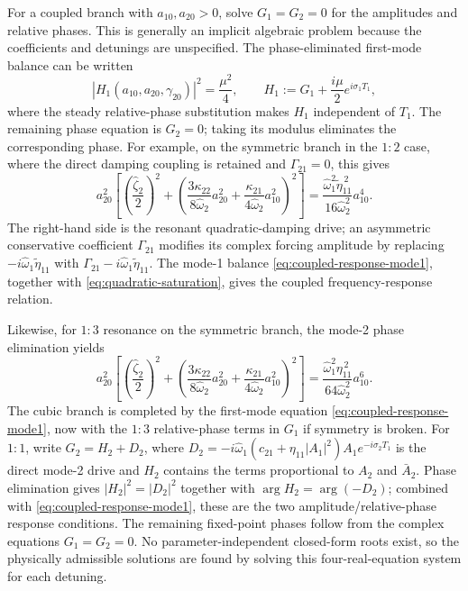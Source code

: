\documentclass[11pt]{article}
\begin{document}
For a coupled branch with $a_{10},a_{20}>0$, solve $G_1=G_2=0$ for the amplitudes and relative phases. This is generally an implicit algebraic problem because the coefficients and detunings are unspecified. The phase-eliminated first-mode balance can be written
\begin{equation}\label{eq:coupled-response-mode1}
|H_1(a_{10},a_{20},\gamma_{20})|^2=\frac{\mu^2}{4},\qquad
H_1:=G_1+\frac{i\mu}{2}e^{i\sigma_1T_1},
\end{equation}
where the steady relative-phase substitution makes $H_1$ independent of $T_1$. The remaining phase equation is $G_2=0$; taking its modulus eliminates the corresponding phase. For example, on the symmetric branch in the $1{:}2$ case, where the direct damping coupling is retained and $\Gamma_{21}=0$, this gives
\begin{equation}\label{eq:quadratic-saturation}
a_{20}^2\left[\left(\frac{\hat\zeta_2}{2}\right)^2+
\left(\frac{3\kappa_{22}}{8\hat\omega_2}a_{20}^2+
\frac{\kappa_{21}}{4\hat\omega_2}a_{10}^2\right)^2\right]
=\frac{\hat\omega_1^2\widetilde\eta_{11}^{\,2}}{16\hat\omega_2^2}a_{10}^4.
\end{equation}
The right-hand side is the resonant quadratic-damping drive; an asymmetric conservative coefficient $\Gamma_{21}$ modifies its complex forcing amplitude by replacing $-i\hat\omega_1\widetilde\eta_{11}$ with $\Gamma_{21}-i\hat\omega_1\widetilde\eta_{11}$. The mode-1 balance \eqref{eq:coupled-response-mode1}, together with \eqref{eq:quadratic-saturation}, gives the coupled frequency-response relation.

Likewise, for $1{:}3$ resonance on the symmetric branch, the mode-2 phase elimination yields
\begin{equation}\label{eq:cubic-saturation}
a_{20}^2\left[\left(\frac{\hat\zeta_2}{2}\right)^2+
\left(\frac{3\kappa_{22}}{8\hat\omega_2}a_{20}^2+
\frac{\kappa_{21}}{4\hat\omega_2}a_{10}^2\right)^2\right]
=\frac{\hat\omega_1^2\eta_{11}^{\,2}}{64\hat\omega_2^2}a_{10}^6.
\end{equation}
The cubic branch is completed by the first-mode equation \eqref{eq:coupled-response-mode1}, now with the $1{:}3$ relative-phase terms in $G_1$ if symmetry is broken. For $1{:}1$, write $G_2=H_2+D_2$, where $D_2=-i\hat\omega_1(c_{21}+\eta_{11}|A_1|^2)A_1e^{-i\sigma_2T_1}$ is the direct mode-2 drive and $H_2$ contains the terms proportional to $A_2$ and $\bar A_2$. Phase elimination gives $|H_2|^2=|D_2|^2$ together with $\arg H_2=\arg(-D_2)$; combined with \eqref{eq:coupled-response-mode1}, these are the two amplitude/relative-phase response conditions. The remaining fixed-point phases follow from the complex equations $G_1=G_2=0$. No parameter-independent closed-form roots exist, so the physically admissible solutions are found by solving this four-real-equation system for each detuning.
\end{document}
